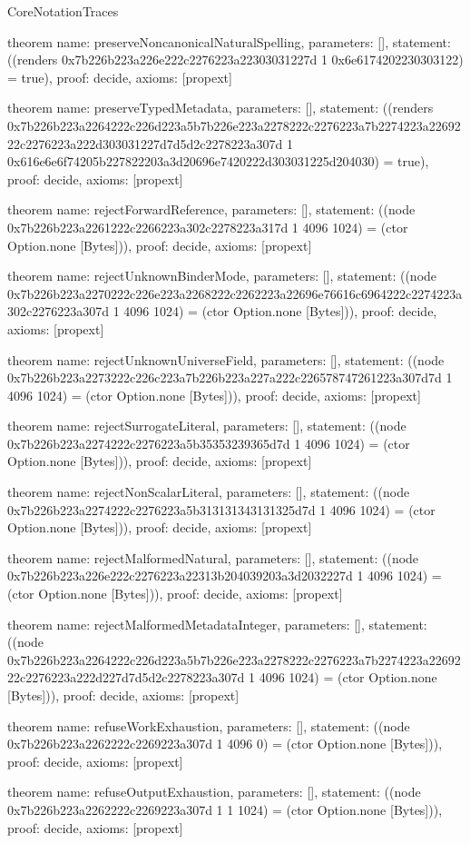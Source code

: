 \begin{lexlean}{CoreNotationTraces}
\begin{semanticmodule}
theorem{
 name: preserveNoncanonicalNaturalSpelling,
 parameters: [],
 statement: ((renders 0x7b226b223a226e222c2276223a22303031227d 1 0x6e6174202230303122) = true),
 proof: decide{},
 axioms: [propext]
}

theorem{
 name: preserveTypedMetadata,
 parameters: [],
 statement: ((renders 0x7b226b223a2264222c226d223a5b7b226e223a2278222c2276223a7b2274223a2269222c2276223a222d303031227d7d5d2c2278223a307d 1 0x616e6e6f74205b227822203a3d20696e7420222d303031225d204030) = true),
 proof: decide{},
 axioms: [propext]
}

theorem{
 name: rejectForwardReference,
 parameters: [],
 statement: ((node 0x7b226b223a2261222c2266223a302c2278223a317d 1 4096 1024) = (ctor Option.none [Bytes])),
 proof: decide{},
 axioms: [propext]
}

theorem{
 name: rejectUnknownBinderMode,
 parameters: [],
 statement: ((node 0x7b226b223a2270222c226e223a2268222c2262223a22696e76616c6964222c2274223a302c2276223a307d 1 4096 1024) = (ctor Option.none [Bytes])),
 proof: decide{},
 axioms: [propext]
}

theorem{
 name: rejectUnknownUniverseField,
 parameters: [],
 statement: ((node 0x7b226b223a2273222c226c223a7b226b223a227a222c226578747261223a307d7d 1 4096 1024) = (ctor Option.none [Bytes])),
 proof: decide{},
 axioms: [propext]
}

theorem{
 name: rejectSurrogateLiteral,
 parameters: [],
 statement: ((node 0x7b226b223a2274222c2276223a5b35353239365d7d 1 4096 1024) = (ctor Option.none [Bytes])),
 proof: decide{},
 axioms: [propext]
}

theorem{
 name: rejectNonScalarLiteral,
 parameters: [],
 statement: ((node 0x7b226b223a2274222c2276223a5b313131343131325d7d 1 4096 1024) = (ctor Option.none [Bytes])),
 proof: decide{},
 axioms: [propext]
}

theorem{
 name: rejectMalformedNatural,
 parameters: [],
 statement: ((node 0x7b226b223a226e222c2276223a22313b204039203a3d2032227d 1 4096 1024) = (ctor Option.none [Bytes])),
 proof: decide{},
 axioms: [propext]
}

theorem{
 name: rejectMalformedMetadataInteger,
 parameters: [],
 statement: ((node 0x7b226b223a2264222c226d223a5b7b226e223a2278222c2276223a7b2274223a2269222c2276223a222d227d7d5d2c2278223a307d 1 4096 1024) = (ctor Option.none [Bytes])),
 proof: decide{},
 axioms: [propext]
}

theorem{
 name: refuseWorkExhaustion,
 parameters: [],
 statement: ((node 0x7b226b223a2262222c2269223a307d 1 4096 0) = (ctor Option.none [Bytes])),
 proof: decide{},
 axioms: [propext]
}

theorem{
 name: refuseOutputExhaustion,
 parameters: [],
 statement: ((node 0x7b226b223a2262222c2269223a307d 1 1 1024) = (ctor Option.none [Bytes])),
 proof: decide{},
 axioms: [propext]
}

\end{semanticmodule}
\end{lexlean}
